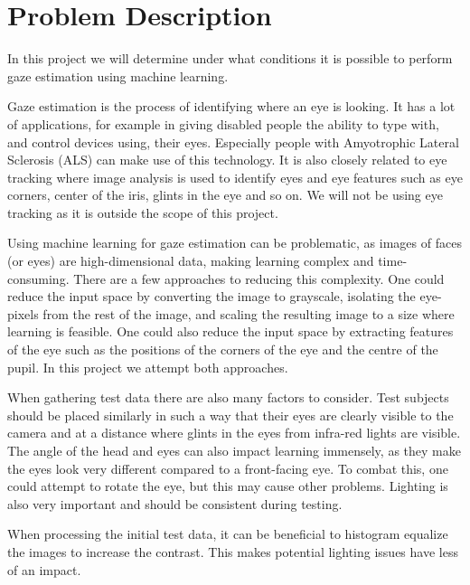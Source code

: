 \section{Problem Description}
In this project we will determine under what conditions it is possible to perform gaze estimation using machine learning.

Gaze estimation is the process of identifying where an eye is looking.
It has a lot of applications, for example in giving disabled people the ability to type with, and control devices using, their eyes.
Especially people with Amyotrophic Lateral Sclerosis (ALS) can make use of this technology.
It is also closely related to eye tracking where image analysis is used to identify eyes and eye features such as eye corners, center of the iris, glints in the eye and so on.
We will not be using eye tracking as it is outside the scope of this project.

Using machine learning for gaze estimation can be problematic, as images of faces (or eyes) are high-dimensional data, making learning complex and time-consuming.
There are a few approaches to reducing this complexity.
One could reduce the input space by converting the image to grayscale, isolating the eye-pixels from the rest of the image, and scaling the resulting image to a size where learning is feasible.
One could also reduce the input space by extracting features of the eye such as the positions of the corners of the eye and the centre of the pupil.
In this project we attempt both approaches.

When gathering test data there are also many factors to consider.
Test subjects should be placed similarly in such a way that their eyes are clearly visible to the camera and at a distance where glints in the eyes from infra-red lights are visible.
The angle of the head and eyes can also impact learning immensely, as they make the eyes look very different compared to a front-facing eye.
To combat this, one could attempt to rotate the eye, but this may cause other problems.
Lighting is also very important and should be consistent during testing.

When processing the initial test data, it can be beneficial to histogram equalize the images to increase the contrast.
This makes potential lighting issues have less of an impact.